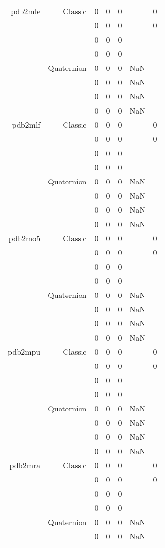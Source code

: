 \begin{xltabular}{\textwidth}{r|rcccSc}
pdb2mle & Classic & 0 & 0 & 0 & & 0 \\
& & 0 & 0 & 0 & & 0 \\
& & 0 & 0 & 0 & & \\
& & 0 & 0 & 0 & & \\
& Quaternion & 0 & 0 & 0 & NaN & \\
& & 0 & 0 & 0 & NaN & \\
& & 0 & 0 & 0 & NaN & \\
& & 0 & 0 & 0 & NaN & \\ \addlinespace
pdb2mlf & Classic & 0 & 0 & 0 & & 0 \\
& & 0 & 0 & 0 & & 0 \\
& & 0 & 0 & 0 & & \\
& & 0 & 0 & 0 & & \\
& Quaternion & 0 & 0 & 0 & NaN & \\
& & 0 & 0 & 0 & NaN & \\
& & 0 & 0 & 0 & NaN & \\
& & 0 & 0 & 0 & NaN & \\ \addlinespace
pdb2mo5 & Classic & 0 & 0 & 0 & & 0 \\
& & 0 & 0 & 0 & & 0 \\
& & 0 & 0 & 0 & & \\
& & 0 & 0 & 0 & & \\
& Quaternion & 0 & 0 & 0 & NaN & \\
& & 0 & 0 & 0 & NaN & \\
& & 0 & 0 & 0 & NaN & \\
& & 0 & 0 & 0 & NaN & \\ \addlinespace
pdb2mpu & Classic & 0 & 0 & 0 & & 0 \\
& & 0 & 0 & 0 & & 0 \\
& & 0 & 0 & 0 & & \\
& & 0 & 0 & 0 & & \\
& Quaternion & 0 & 0 & 0 & NaN & \\
& & 0 & 0 & 0 & NaN & \\
& & 0 & 0 & 0 & NaN & \\
& & 0 & 0 & 0 & NaN & \\ \addlinespace
pdb2mra & Classic & 0 & 0 & 0 & & 0 \\
& & 0 & 0 & 0 & & 0 \\
& & 0 & 0 & 0 & & \\
& & 0 & 0 & 0 & & \\
& Quaternion & 0 & 0 & 0 & NaN & \\
& & 0 & 0 & 0 & NaN & \\

\end{xltabular}
